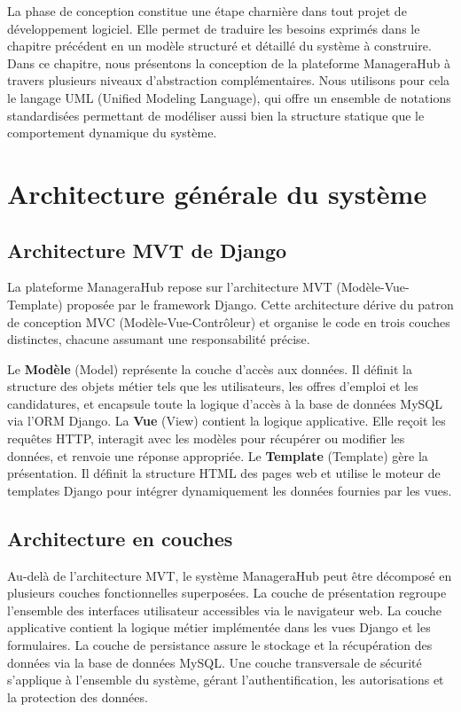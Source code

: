 \documentclass[12pt,a4paper]{report}
\begin{document}
La phase de conception constitue une étape charnière dans tout projet de développement logiciel. Elle permet de traduire les besoins exprimés dans le chapitre précédent en un modèle structuré et détaillé du système à construire. Dans ce chapitre, nous présentons la conception de la plateforme ManageraHub à travers plusieurs niveaux d'abstraction complémentaires. Nous utilisons pour cela le langage UML (Unified Modeling Language), qui offre un ensemble de notations standardisées permettant de modéliser aussi bien la structure statique que le comportement dynamique du système.

\section{Architecture générale du système}

\subsection{Architecture MVT de Django}

La plateforme ManageraHub repose sur l'architecture MVT (Modèle-Vue-Template) proposée par le framework Django. Cette architecture dérive du patron de conception MVC (Modèle-Vue-Contrôleur) et organise le code en trois couches distinctes, chacune assumant une responsabilité précise.

Le \textbf{Modèle} (Model) représente la couche d'accès aux données. Il définit la structure des objets métier tels que les utilisateurs, les offres d'emploi et les candidatures, et encapsule toute la logique d'accès à la base de données MySQL via l'ORM Django. La \textbf{Vue} (View) contient la logique applicative. Elle reçoit les requêtes HTTP, interagit avec les modèles pour récupérer ou modifier les données, et renvoie une réponse appropriée. Le \textbf{Template} (Template) gère la présentation. Il définit la structure HTML des pages web et utilise le moteur de templates Django pour intégrer dynamiquement les données fournies par les vues.

\subsection{Architecture en couches}

Au-delà de l'architecture MVT, le système ManageraHub peut être décomposé en plusieurs couches fonctionnelles superposées. La couche de présentation regroupe l'ensemble des interfaces utilisateur accessibles via le navigateur web. La couche applicative contient la logique métier implémentée dans les vues Django et les formulaires. La couche de persistance assure le stockage et la récupération des données via la base de données MySQL. Une couche transversale de sécurité s'applique à l'ensemble du système, gérant l'authentification, les autorisations et la protection des données.
\end{document}
